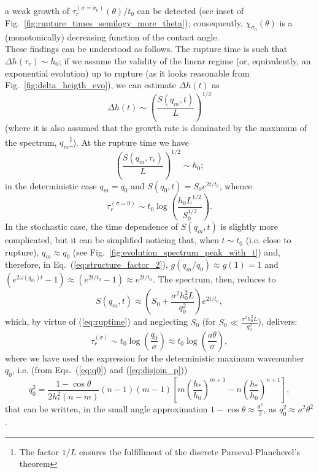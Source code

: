 a weak growth of $\tau_r^{(\sigma=\sigma_0)}(\theta)/t_0$ can be detected (see inset of Fig.~\ref{fig:rupture_times_semilogy_more_theta}); consequently, $\chi_{\sigma_0}(\theta)$ is a (monotonically) decreasing function of the contact angle.\\
These findings can be understood as follows. 
The rupture time is such that $\Delta h(\tau_r) \sim h_0$; if we assume the validity of the linear regime (or, equivalently, an exponential evolution) up to rupture (as it looks reasonable from Fig.~\ref{fig:delta_heigth_evo}), we can estimate $\Delta h(t)$ as 
$$
  \Delta h(t) \sim \left(\frac{S(q_m,t)}{L}\right)^{1/2}
$$
(where it is also assumed that the growth rate is dominated by the maximum of the spectrum, $q_m$\footnote{The factor $1/L$ ensures the fulfillment of the discrete Parseval-Plancherel's theorem}).
At the rupture time we have
\begin{equation}\label{eq:ruptime}
  \left(\frac{S(q_m,\tau_r)}{L}\right)^{1/2} \sim h_0;
\end{equation}
in the deterministic case $q_m=q_0$ and $S(q_0,t) = S_0e^{2t/t_0}$, 
whence
\begin{equation}\label{eq:taur_det}
    \tau_r^{(\sigma=0)} \sim t_0 \log\left(\frac{h_0 L^{1/2}}{S_0^{1/2}}\right).
\end{equation}
In the stochastic case, the time dependence of $S(q_m,t)$ is slightly more complicated, but it can be simplified noticing that, when $t \sim t_0$ (i.e. close to rupture), $q_m \approx q_0$ (see Fig.~\ref{fig:evolution_spectrum_peak_with_t}) and, therefore, in Eq.~(\ref{eq:structure_factor_2}), $g(q_m/q_0) \approx g(1) = 1$ and $(e^{2\omega(q_m)t}-1) \approx (e^{2t/t_0}-1) \approx e^{2t/t_0}$.
The spectrum, then, reduces to 
$$
  S(q_m,t) \approx \left(S_0 + \frac{\sigma^2 h_0^2 L}{q_0^2}\right)e^{2t/t_0},
$$
which, by virtue of (\ref{eq:ruptime}) and neglecting $S_0$ (for $S_0 \ll \frac{\sigma^2 h_0^2 L}{q_0^2}$), delivers:
\begin{equation}\label{eq:taur_stoch}
    \tau_r^{(\sigma)} \sim t_0 \log\left(\frac{q_0}{\sigma}\right) \approx t_0 \log \left( \frac{a \theta}{\sigma}\right),
\end{equation}
where we have used the expression for the deterministic maximum wavenumber $q_0$, i.e. (from Eqs.~(\ref{eq:q0}) and (\ref{eq:disjoin_p})) 
$$
  q_0^2=\frac{1-\cos \theta}{2h_{\ast}^2(n-m)}(n-1)(m-1)\left[m\left(\frac{h_{\ast}}{h_0}\right)^{m+1} - n\left(\frac{h_{\ast}}{h_0}\right)^{n+1}\right],
$$ 
that can be written, in the small angle approximation $1-\cos \theta \approx \frac{\theta^2}{2}$, as $q_0^2 \approx a^2 \theta^2$.
